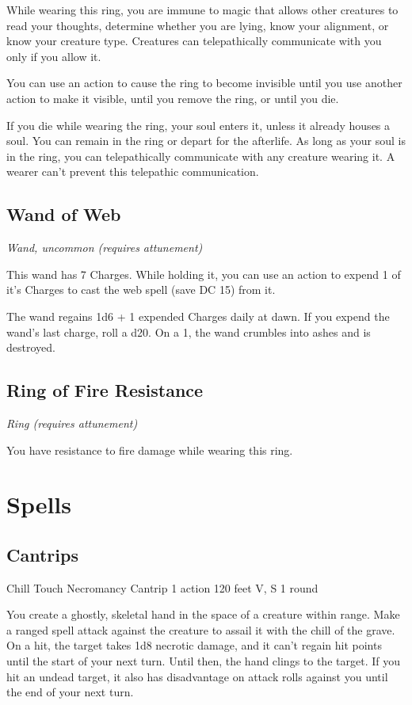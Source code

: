 \documentclass[letterpaper,openany,oneside,twocolumn]{book}
\begin{document}
While wearing this ring, you are immune to magic that allows other creatures to read your thoughts, determine whether you are lying, know your alignment, or know your creature type. Creatures can telepathically communicate with you only if you allow it.

You can use an action to cause the ring to become invisible until you use another action to make it visible, until you remove the ring, or until you die.

If you die while wearing the ring, your soul enters it, unless it already houses a soul. You can remain in the ring or depart for the afterlife. As long as your soul is in the ring, you can telepathically communicate with any creature wearing it. A wearer can't prevent this telepathic communication.

\subsection*{Wand of Web}
\textit{Wand, uncommon (requires attunement)}

This wand has 7 Charges. While holding it, you can use an action to expend 1 of it's Charges to cast the web spell (save DC 15) from it.

The wand regains 1d6 + 1 expended Charges daily at dawn. If you expend the wand's last charge, roll a d20. On a 1, the wand crumbles into ashes and is destroyed.


\subsection*{Ring of Fire Resistance}
\textit{Ring (requires attunement)}

You have resistance to fire damage while wearing this ring.

\section*{Spells}

\subsection*{Cantrips}

\DndSpellHeader
  {Chill Touch}
  {Necromancy Cantrip}
  {1 action}
  {120 feet}
  {V, S}
  {1 round}

You create a ghostly, skeletal hand in the space of a creature within range. Make a ranged spell attack against the creature to assail it with the chill of the grave. On a hit, the target takes 1d8 necrotic damage, and it can't regain hit points until the start of your next turn. Until then, the hand clings to the target. If you hit an undead target, it also has disadvantage on attack rolls against you until the end of your next turn.
\end{document}
